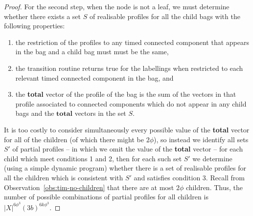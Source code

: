 \documentclass[a4paper,UKenglish,cleveref, autoref, thm-restate]{lipics-v2021} %
\begin{document}
\begin{proof}
    For the second step, when the node is not a leaf, we must determine whether there exists a set $S$ of realisable profiles for all the child bags with the following properties:
    \begin{enumerate}
        \item the restriction of the profiles to any timed connected component that appears in the bag and a child bag must must be the same,
        \item the transition routine returns true for the labellings when restricted to each relevant timed connected component in the bag, and
        \item the \textbf{total} vector of the profile of the bag is the sum of the vectors in that profile associated to connected components which do not appear in any child bags and the $\textbf{total}$ vectors in the set $S$.
    \end{enumerate}   
    It is too costly to consider simultaneously every possible value of the \textbf{total} vector for all of the children (of which there might be $2\phi$), so instead we identify all sets $S'$ of partial profiles -- in which we omit the value of the \textbf{total} vector -- for each child which meet conditions 1 and 2, then for each such set $S'$ we determine (using a simple dynamic program) whether there is a set of realisable profiles for all the children which is consistent with $S'$ and satisfies condition 3.  Recall from Observation~\ref{obs:tim-no-children} that there are at most $2 \phi$ children.  Thus, the number of possible combinations of partial profiles for all children is $|X|^{6 \phi^3} (3b)^{6k\phi^3}$.


\end{proof}
\end{document}
